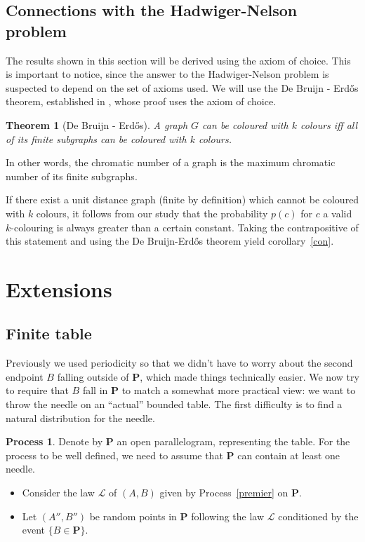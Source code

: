 \documentclass[a4paper,11pt]{article}
\newtheorem{theo}{Theorem}
\theoremstyle{definition}
\newtheorem{process}{Process}
\theoremstyle{remark}
\renewcommand{\P}{\mathbf{P}}
\begin{document}
\subsection{Connections with the Hadwiger-Nelson problem} \label{hn}
The results shown in this section will be derived using the axiom of choice. 
This is important to notice, since the answer to the Hadwiger-Nelson problem is 
suspected to depend on the set of axioms used. We will use the 
De Bruijn - Erd\H{o}s theorem, established in \cite{erdos}, whose proof uses 
the axiom of choice.
\begin{theo}[De Bruijn - Erdős]
 A graph $G$ can be coloured with $k$ colours iff all of its finite subgraphs 
 can be coloured with $k$ colours.
\end{theo}
In other words, the chromatic number of a graph is the maximum chromatic number 
of its finite subgraphs.

If there exist a unit distance graph (finite by definition) which cannot 
be coloured with $k$ colours, it 
follows from our study that the probability $p(c)$ for $c$ a valid 
$k$-colouring is always greater than a certain constant. Taking the 
contrapositive of this statement and using the De Bruijn-Erdős theorem yield 
corollary~\ref{con}.

\section{Extensions}
\label{ext}
\subsection{Finite table}
\label{fini}

Previously we used periodicity so that we didn't have to worry about the second 
endpoint $B$ falling outside of $\mathbf{P}$, which made things technically easier. We now 
try to require that $B$ fall in $\mathbf{P}$ to match a somewhat more practical 
view: we want to throw the needle on an ``actual'' bounded 
table. The first difficulty is to find a natural distribution for the needle.

\begin{process} \label{encore}
Denote by $\mathbf{P}$ an open parallelogram, representing the table. For the 
process to be well defined, we need to assume that $\mathbf{P}$ can contain at
least one needle.
\begin{itemize}
\item Consider the law $\mathcal{L}$ of $(A,B)$ given by Process~\ref{premier} on $\P$.
\item Let $(A'',B'')$ be random points in $\P$ following the law
$\mathcal{L}$ conditioned by the event $\{B \in \mathbf{P} \}$.
\end{itemize}
\end{process}
\end{document}
